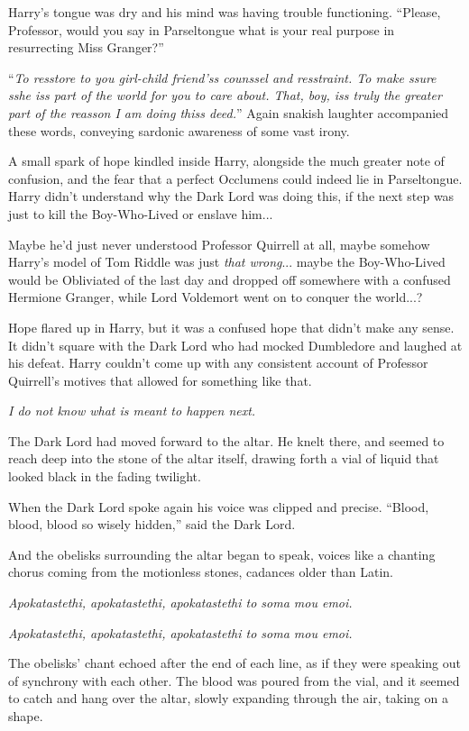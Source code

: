 Harry's tongue was dry and his mind was having trouble functioning. ``Please, Professor, would you say in Parseltongue what is your real purpose in resurrecting Miss Granger?''

``\emph{To resstore to you girl-child friend'ss counssel and resstraint. To make ssure sshe iss part of the world for you to care about. That, boy, iss truly the greater part of the reasson I am doing thiss deed.}'' Again snakish laughter accompanied these words, conveying sardonic awareness of some vast irony.

A small spark of hope kindled inside Harry, alongside the much greater note of confusion, and the fear that a perfect Occlumens could indeed lie in Parseltongue. Harry didn't understand why the Dark Lord was doing this, if the next step was just to kill the Boy-Who-Lived or enslave him...

Maybe he'd just never understood Professor Quirrell at all, maybe somehow Harry's model of Tom Riddle was just \emph{that wrong}... maybe the Boy-Who-Lived would be Obliviated of the last day and dropped off somewhere with a confused Hermione Granger, while Lord Voldemort went on to conquer the world...?

Hope flared up in Harry, but it was a confused hope that didn't make any sense. It didn't square with the Dark Lord who had mocked Dumbledore and laughed at his defeat. Harry couldn't come up with any consistent account of Professor Quirrell's motives that allowed for something like that.

\emph{I do not know what is meant to happen next.}

The Dark Lord had moved forward to the altar. He knelt there, and seemed to reach deep into the stone of the altar itself, drawing forth a vial of liquid that looked black in the fading twilight.

When the Dark Lord spoke again his voice was clipped and precise. ``Blood, blood, blood so wisely hidden,'' said the Dark Lord.

And the obelisks surrounding the altar began to speak, voices like a chanting chorus coming from the motionless stones, cadances older than Latin.

\emph{Apokatastethi, apokatastethi, apokatastethi to soma mou emoi.}

\emph{Apokatastethi, apokatastethi, apokatastethi to soma mou emoi.}

The obelisks' chant echoed after the end of each line, as if they were speaking out of synchrony with each other. The blood was poured from the vial, and it seemed to catch and hang over the altar, slowly expanding through the air, taking on a shape.

